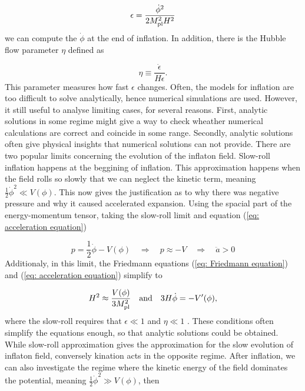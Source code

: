 \begin{equation}
    \epsilon = \frac{\dot{\phi}^2}{2 M_{\rm pl}^2 H^2}
\end{equation}
we can compute the $\dot{\phi}$ at the end of inflation. In addition, there is the Hubble flow parameter $\eta$ defined as

\begin{equation}
    \eta \equiv \frac{\dot{\epsilon}}{H \epsilon}.
\end{equation}
This parameter measures how fast $\epsilon$ changes. Often, the models for inflation are too difficult to solve analytically, hence numerical simulations are used. However, it still useful to analyse limiting cases, for several reasons. First, analytic solutions in some regime might give a way to check wheather numerical calculations are correct and coincide in some range. Secondly, analytic solutions often give physical insights that numerical solutions can not provide. There are two popular limits concerning the evolution of the inflaton field. Slow-roll inflation happens at the beggining of inflation. This approximation happens when the field rolls so slowly that we can neglect the kinetic term, meaning $\frac{1}{2} \dot{\phi}^2 \ll V(\phi)$. This now gives the justification as to why there was negative pressure and why it caused accelerated expansion. Using the spacial part of the energy-momentum tensor, taking the slow-roll limit and equation (\ref{eq: acceleration equation})

\begin{equation}
    p = \frac{1}{2} \dot{\phi} - V(\phi) \quad \Rightarrow \quad p \approx -V \quad \Rightarrow \quad \ddot{a} > 0
\end{equation}
Additionaly, in this limit, the Friedmann equations (\ref{eq: Friedmann equation}) and (\ref{eq: acceleration equation}) simplify to

\begin{equation}
    H^2 \approx \frac{V(\phi)}{3 M_{\rm pl}^2} \quad \text{and} \quad 3 H \dot{\phi} = - V^{\prime}(\phi),
\end{equation}
where the slow-roll requires that $\epsilon \ll 1$ and $\eta \ll 1$ \cite{kofman1994reheating}. These conditions often simplify the equations enough, so that analytic solutions could be obtained. While slow-roll approximation gives the approximation for the slow evolution of inflaton field, conversely kination acts in the opposite regime. After inflation, we can also investigate the regime where the kinetic energy of the field dominates the potential, meaning $\frac{1}{2} \dot{\phi}^2 \gg V(\phi)$, then

